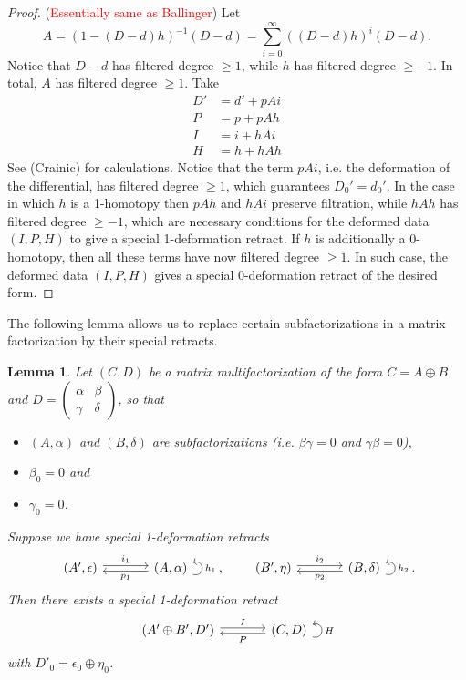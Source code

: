 \documentclass{article}
\newcommand{\sdr}[5]{%
  \begin{tikzcd}[column sep=large, ampersand replacement=\&]
    {#1} \arrow[r, "{#3}", shift left=0.5ex,] \arrow[r, leftarrow, "{#4}", shift right=0.5ex, swap] \& 
    #2 \arrow[loop right, distance=1em, in=15, out=-15, "{#5}",swap]
  \end{tikzcd}%
}
\theoremstyle{plain} %
\newtheorem{lemma}[theorem]{Lemma}
\theoremstyle{definition} %
\theoremstyle{remark} %
\begin{document}
\begin{proof}(\textcolor{red}{Essentially same as Ballinger}) Let 
	$$A=(1-(D-d)h)^{-1}(D-d)=\sum_{i=0}^{\infty} ((D-d)h)^i(D-d). $$
	Notice that $D-d$ has filtered degree $\geq 1$, while $h$ has filtered degree $\geq -1$. In total, $A$ has filtered degree $\geq 1$.
	Take 
	\begin{equation}\label{eq:deformedsdrdata}
		\begin{aligned}
			D'&=d'+pAi
			\\
			P&=p+pAh
			\\
			I&=i+hAi
			\\
			H&=h+hAh
		\end{aligned}
	\end{equation}See (Crainic) for calculations. Notice that the term $pAi$, i.e. the deformation of the differential, has filtered degree $\geq 1$, which guarantees $D_0'=d_0'$. In the case in which $h$ is a 1-homotopy then $pAh$ and $hAi$ preserve filtration, while $hAh$ has filtered degree $\geq -1$, which are necessary conditions for the deformed data $(I,P,H)$ to give a special 1-deformation retract. If $h$ is additionally a 0-homotopy, then all these terms have now filtered degree $\geq 1$. In such case, the deformed data $(I,P,H)$ gives a special 0-deformation retract of the desired form.
\end{proof}

The following lemma allows us to replace certain subfactorizations in a matrix factorization by their special retracts.

\begin{lemma}\label{SummandLemma}
	Let $(C,D)$ be a matrix multifactorization of the form $C=A\oplus B$ and 
	$D=\begin{pmatrix}\alpha & \beta \\ \gamma & \delta \end{pmatrix}$, so that \begin{itemize}
		\item $(A,\alpha)$ and $(B,\delta)$ are subfactorizations (i.e. $\beta\gamma=0$ and $\gamma\beta=0$), 
		\item $\beta_0=0$  and
		\item $\gamma_0=0$.
	\end{itemize}
Suppose we have special 1-deformation retracts 
$$
\sdr{(A',\epsilon)}{(A,\alpha)}{i_1}{p_1}{h_1}
,\qquad
\sdr{(B',\eta)}{(B,\delta)}{i_2}{p_2}{h_2}
.
$$ 
Then there exists a special 1-deformation retract
	$$
	\sdr{(A'\oplus B',D')}{(C,D)}{I}{P}{H}
	$$
	with $D'_0=\epsilon_0\oplus \eta_0$.
	
	
\end{lemma}
\end{document}
